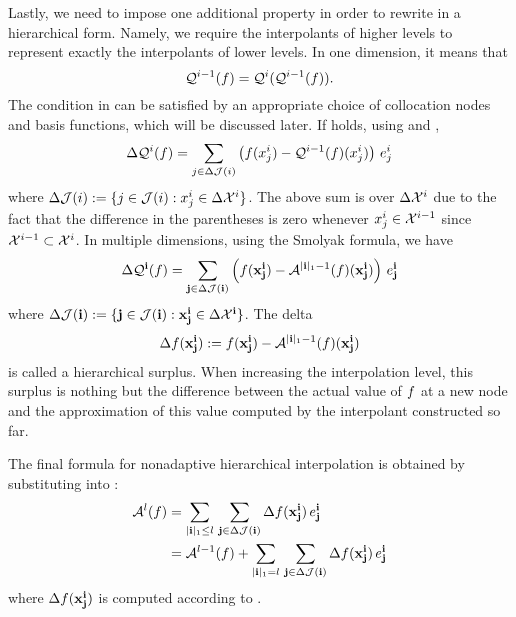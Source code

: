 Lastly, we need to impose one additional property in order to rewrite
 in a hierarchical form. Namely, we require the
interpolants of higher levels to represent exactly the interpolants of lower
levels. In one dimension, it means that
\begin{equation} \elab{tensor-exactness}
  \tensor{i - 1}(\f) = \tensor{i}(\tensor{i - 1}(\f)).
\end{equation}
The condition in  can be satisfied by an appropriate
choice of collocation nodes and basis functions, which will be discussed later.
If  holds, using  and
,
\[
  \Delta\mathcal{Q}^{i}(f) = \sum_{j \in \Delta\mathcal{J}(i)} \left( f(x^i_j) - \mathcal{Q}^{i - 1}(f)(x^i_j) \right) \, e^i_j
\]
where $\Delta\mathcal{J}(i) := \{ j \in \mathcal{J}(i): x^i_j \in \Delta\mathcal{X}^i \}$. The
above sum is over $\Delta\mathcal{X}^i$ due to the fact that the difference in the
parentheses is zero whenever $x^i_j \in \mathcal{X}^{i - 1}$ since $\mathcal{X}^{i - 1} \subset
\mathcal{X}^i$. In multiple dimensions, using the Smolyak formula, we have
\begin{equation} \elab{tensor-delta}
  \Delta\tensor{\vi}(\f) = \sum_{\vj \in \Delta\index(\vi)} \left( \f(\vx^\vi_\vj) - \smolyak{|\vi|_1 - 1}(\f)(\vx^\vi_\vj) \right) \, \e^\vi_\vj
\end{equation}
where $\Delta\mathcal{J}(\mathbf{i}) := \{ \mathbf{j} \in \mathcal{J}(\mathbf{i}): \mathbf{x}^{\mathbf{i}}_{\mathbf{j}} \in \Delta\mathcal{X}^{\mathbf{i}}
\}$. The delta
\begin{equation} \elab{surplus}
  \surplus(\vx^\vi_\vj) := \f(\vx^\vi_\vj) - \smolyak{|\vi|_1 - 1}(\f)(\vx^\vi_\vj)
\end{equation}
is called a hierarchical surplus. When increasing the interpolation level, this
surplus is nothing but the difference between the actual value of $f$ at a new
node and the approximation of this value computed by the interpolant constructed
so far.

The final formula for nonadaptive hierarchical interpolation is obtained by
substituting  into :
\begin{align} 
  \smolyak{l}(\f) &= \sum_{|\vi|_1 \leq l} \, \sum_{\vj \in \Delta\index(\vi)} \surplus(\vx^\vi_\vj) \, \e^\vi_\vj \elab{smolyak-hierarchical} \\
                  &= \smolyak{l-1}(\f) + \sum_{|\vi|_1 = l} \, \sum_{\vj \in \Delta\index(\vi)} \surplus(\vx^\vi_\vj) \, \e^\vi_\vj \nonumber
\end{align}
where $\Delta f(\mathbf{x}^{\mathbf{i}}_{\mathbf{j}})$ is computed according to .
